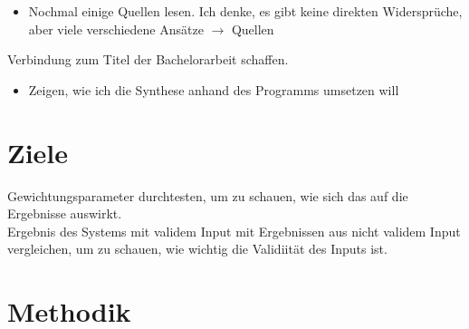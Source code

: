 \begin{itemize}
    \item Nochmal einige Quellen lesen. Ich denke, es gibt keine direkten Widersprüche, aber viele verschiedene Ansätze
    $\rightarrow$ Quellen
\end{itemize}

Verbindung zum Titel der Bachelorarbeit schaffen.

\begin{itemize}
    \item Zeigen, wie ich die Synthese anhand des Programms umsetzen will
\end{itemize}

\section{Ziele}
Gewichtungsparameter durchtesten, um zu schauen, wie sich das auf die Ergebnisse auswirkt.\\
Ergebnis des Systems mit validem Input mit Ergebnissen aus nicht validem Input vergleichen, um zu schauen, wie wichtig
die Validiität des Inputs ist.\\

\section{Methodik}

